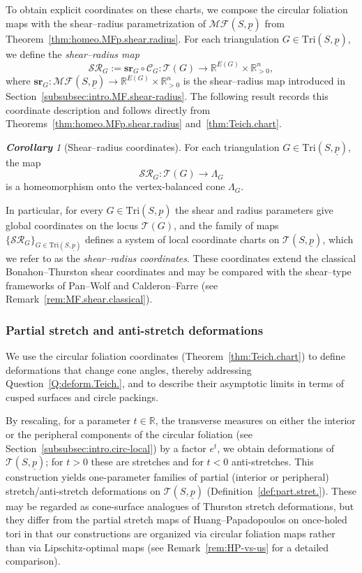 \documentclass[11pt, letterpaper]{amsart}
\theoremstyle{definition}
\theoremstyle{remark}
\newtheorem{corollary}[theorem]{\rm\bf Corollary}
\newcommand{\up}{\underline{p}}
\newcommand{\Sp}{(S,\up)}
\newcommand{\TSp}{\text{Tri}\Sp}
\newcommand{\cMFp}{\mathcal{MF} (S,\up)}
\newcommand{\cC}{\mathcal{C}}
\newcommand{\cSR}{\mathcal{SR}}
\newcommand{\cT}{\mathcal{T}}
\newcommand{\cTp}{\mathcal{T} (S,\up)}
\newcommand{\bR}{\mathbb{R}}
\numberwithin{equation}{section}
\begin{document}
To obtain explicit coordinates on these charts, we compose the circular foliation maps with the shear--radius parametrization of \(\cMFp\) from Theorem~\ref{thm:homeo.MFp.shear.radius}.
For each triangulation \(G \in \TSp\), we define the \emph{shear--radius map}
\[
  \cSR_G := \mathbf{sr}_G \circ \cC_G : \cT(G) \longrightarrow \bR^{E(G)} \times \bR^n_{>0},
\]
where \(\mathbf{sr}_G : \cMFp \to \bR^{E(G)} \times \bR^n_{>0}\) is the shear--radius map introduced in Section~\ref{subsubsec:intro.MF.shear-radius}.
The following result records this coordinate description and follows directly from Theorems~\ref{thm:homeo.MFp.shear.radius} and~\ref{thm:Teich.chart}.

\begin{corollary}[Shear--radius coordinates]
    \label{cor:homeo.TS.shear.radius}
For each triangulation \(G \in \TSp\), the map
\[
  \cSR_G : \cT(G) \longrightarrow \Lambda_G
\]
is a homeomorphism onto the vertex-balanced cone \(\Lambda_G\).
\end{corollary}



In particular, for every \(G \in \TSp\) the shear and radius parameters give global coordinates on the locus \(\cT(G)\), and the family of maps \(\{\cSR_G\}_{G \in \TSp}\) defines a system of local coordinate charts on \(\cTp\), which we refer to as the \emph{shear--radius coordinates}.
These coordinates extend the classical Bonahon--Thurston shear coordinates \cite{Bon96, Thu98} and may be compared with the shear--type frameworks of Pan--Wolf \cite{PW22} and Calderon--Farre \cite{CF24} (see Remark~\ref{rem:MF.shear.classical}).



\subsubsection{Partial stretch and anti-stretch deformations}
\label{subsubsec:intro.partial-stretch}

We use the circular foliation coordinates (Theorem~\ref{thm:Teich.chart}) to define deformations that change cone angles, thereby addressing Question~\ref{Q:deform.Teich.}, and to describe their asymptotic limits in terms of cusped surfaces and circle packings.

By rescaling, for a parameter \(t \in \bR\), the transverse measures on either the interior or the peripheral components of the circular foliation (see Section~\ref{subsubsec:intro.circ-local}) by a factor \(e^t\), we obtain deformations of \(\cT(S,\underline{p})\); for \(t>0\) these are stretches and for \(t<0\) anti-stretches.
This construction yields one-parameter families of partial (interior or peripheral) stretch/anti-stretch deformations on \(\cT(S,\underline{p})\) (Definition~\ref{def:part.stret.}).
These may be regarded as cone-surface analogues of Thurston stretch deformations, but they differ from the partial stretch maps of Huang--Papadopoulos on once-holed tori \cite{HP21} in that our constructions are organized via circular foliation maps rather than via Lipschitz-optimal maps (see Remark~\ref{rem:HP-vs-us} for a detailed comparison).
\end{document}
